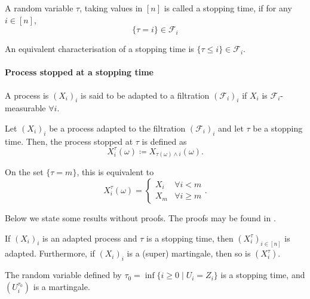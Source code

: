 \begin{dfn}
	A random variable $ \tau $, taking values in $ [n] $ is called a stopping time, if for any $ i \in [n] $,
	\begin{equation*}
		\{ \tau = i \} \in \mathcal{F}_i
	\end{equation*}
\end{dfn}

An equivalent characterisation of a stopping time is $ \{ \tau \le i \} \in \mathcal{F}_i $.

\paragraph{Process stopped at a stopping time}
A process is $ (X_i)_i $ is said to be adapted to a filtration $ (\mathcal{F}_i)_i $ if $ X_i $ is $ \mathcal{F}_i $-measurable $ \forall i $.

Let $ (X_i)_i $ be a process adapted to the filtration $ (\mathcal{F}_i)_i $ and let $ \tau $ be a stopping time. Then, the process stopped at $ \tau $ is defined as
\begin{equation*}
	X_{ i }^{ \tau }( \omega )  \coloneqq  X_{ \tau( \omega ) \wedge i }( \omega ) .
\end{equation*}

On the set $ \{ \tau = m \} $, this is equivalent to
\begin{equation*}
	X_{ i }^{ \tau }( \omega ) = \begin{cases}
		X_i  &  \forall i < m  \\
		X_m  &  \forall i \ge m
	\end{cases} .
\end{equation*}


Below we state some results without proofs. The proofs may be found in \cite[Section 2.2.1]{Lamberton1996}.

\begin{prp}
	If $ (X_i)_i $ is an adapted process and $ \tau $ is a stopping time, then $ ( X_{i}^{\tau} )_{i \in [n]} $ is adapted. Furthermore, if $ (X_i)_i $ is a (super) martingale, then so is $ \left( X_{i}^{\tau} \right) $.
\end{prp}

\begin{prp}
	The random variable defined by $ \tau_0 = \inf \{ i \ge 0 \mid U_i = Z_i \} $ is a stopping time, and $ (U_i^{\tau_0}) $ is a martingale.
\end{prp}

